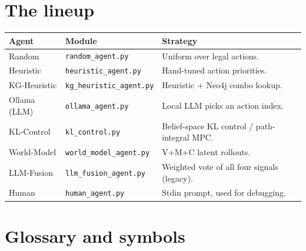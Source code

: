 \documentclass[11pt,a4paper]{article}
\begin{document}
\section{The lineup}

\begin{table}[h]
\centering
\small
\begin{tabularx}{\linewidth}{l l X}
\toprule
\textbf{Agent} & \textbf{Module} & \textbf{Strategy} \\
\midrule
Random              & \texttt{random\_agent.py}           & Uniform over legal actions. \\
Heuristic           & \texttt{heuristic\_agent.py}        & Hand-tuned action priorities. \\
KG-Heuristic        & \texttt{kg\_heuristic\_agent.py}    & Heuristic + Neo4j combo lookup. \\
Ollama (LLM)        & \texttt{ollama\_agent.py}           & Local LLM picks an action index. \\
KL-Control          & \texttt{kl\_control.py}             & Belief-space KL control / path-integral MPC. \\
World-Model         & \texttt{world\_model\_agent.py}     & V+M+C latent rollouts. \\
LLM-Fusion          & \texttt{llm\_fusion\_agent.py}      & Weighted vote of all four signals (legacy). \\
Human               & \texttt{human\_agent.py}            & Stdin prompt, used for debugging. \\
\bottomrule
\end{tabularx}
\end{table}

\section{Glossary and symbols}
\end{document}

